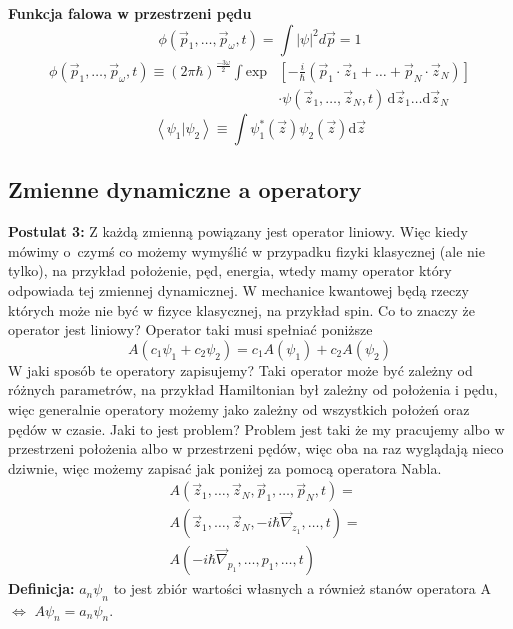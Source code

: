 \textbf{Funkcja falowa w przestrzeni pędu}
\begin{equation*}
	\phi (\vec{p}_1, \dots, \vec{p}_{\omega}, t) = \int |\psi|^2 d \vec{p} = 1
\end{equation*}
\begin{equation*}
	\begin{split}
		\phi (\vec{p}_1, \dots, \vec{p}_{\omega}, t) \equiv (2 \pi \hbar)^{\frac{-3\omega}{2}} \int \text{exp}&\left[ -\frac{i}{\hbar} (\vec{p}_1 \cdot \vec{z}_1 + \dots + \vec{p}_N \cdot \vec{z}_N)  \right] \\
		&\cdot \psi(\vec{z}_1, \dots, \vec{z}_N, t) \hspace{2pt} \text{d}\vec{z}_1 \dots \text{d}\vec{z}_N
	\end{split}
\end{equation*}
\begin{equation*}
	\left< \psi_1 \vert \psi_2 \right> \equiv \int \psi_1^*(\vec{z}) \psi_2(\vec{z})\text{d}\vec{z} 	
\end{equation*}
\subsection{Zmienne dynamiczne a operatory}
\textbf{Postulat 3:} Z każdą zmienną powiązany jest operator liniowy. 
Więc kiedy mówimy o~czymś co możemy wymyślić w przypadku fizyki klasycznej (ale nie tylko), na przykład położenie, pęd, energia, wtedy mamy operator który odpowiada tej zmiennej dynamicznej. W mechanice kwantowej będą rzeczy których może nie być w fizyce klasycznej, na przykład spin. 
Co to znaczy że operator jest liniowy? Operator taki musi spełniać poniższe
\begin{equation*}
	A(c_1 \psi_1 + c_2 \psi_2) = c_1 A(\psi_1) + c_2 A(\psi_2)
\end{equation*}
W jaki sposób te operatory zapisujemy? Taki operator może być zależny od różnych parametrów, na przykład Hamiltonian był zależny od położenia i pędu, więc generalnie operatory możemy jako zależny od wszystkich położeń oraz pędów w czasie. Jaki to jest problem? Problem jest taki że my pracujemy albo w przestrzeni położenia albo w przestrzeni pędów, więc oba na raz wyglądają nieco dziwnie, więc możemy zapisać jak poniżej za pomocą operatora Nabla.
\begin{equation*}
	\begin{split}
		&A(\vec{z}_1, \dots, \vec{z}_N, \vec{p}_1, \dots, \vec{p}_N, t) = \\
		&A(\vec{z}_1, \dots, \vec{z}_N, -i \hbar \vec{\nabla}_{z_1}, \dots, t) = \\
		&A(-i \hbar \vec{\nabla}_{p_1}, \dots, p_1, \dots, t)
	\end{split}	
\end{equation*}
\textbf{Definicja:} ${a_n \psi}_n$ to jest zbiór wartości własnych a również stanów operatora A $\iff$ $A \psi_n = a_n \psi_n$.

